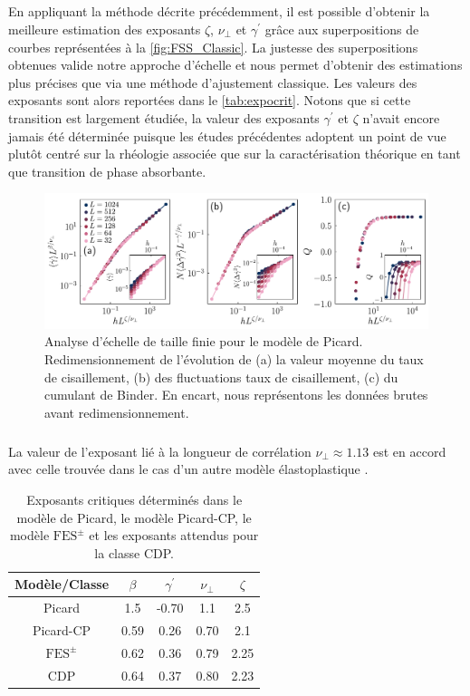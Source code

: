 \subparagraph{}En appliquant la méthode décrite précédemment, il est possible d'obtenir la meilleure estimation des exposants $\zeta$, $\nu_\perp$ et $\gamma^\prime$ grâce aux superpositions de courbes représentées à la \autoref{fig:FSS_Classic}. La justesse des superpositions obtenues valide notre approche d'échelle et  nous permet d'obtenir des estimations plus précises que via une méthode d'ajustement classique. Les valeurs des exposants sont alors reportées dans le \autoref{tab:expocrit}. Notons que si cette transition est largement étudiée, la valeur des exposants $\gamma^\prime$ et $\zeta$ n'avait encore jamais été déterminée puisque les études précédentes adoptent un point de vue plutôt centré sur la rhéologie associée que sur la caractérisation théorique en tant que transition de phase absorbante.

\begin{figure}[h]
	\centering
	\includegraphics[width=\textwidth]{Chapitre4/Figures/CasPhysique/FSS_Classic_edited.pdf}
	\caption{Analyse d'échelle de taille finie pour le modèle de Picard. Redimensionnement de l'évolution de (a) la valeur moyenne du taux de cisaillement, (b) des fluctuations taux de cisaillement, (c) du cumulant de Binder. En encart, nous représentons les données brutes avant redimensionnement.}
	\label{fig:FSS_Classic}
\end{figure}

\subparagraph{}La valeur de l'exposant lié à la longueur de corrélation $\nu_\perp \approx 1.13$ est en accord avec celle trouvée dans le cas d'un autre modèle élastoplastique \cite{lin_scaling_2014}.

\begin{table}
\centering
\begin{tabular}{ccccc}
\hline \hline Modèle/Classe & $\beta$ & \multicolumn{1}{c}{$\gamma^{\prime}$} & $\nu_{\perp}$ & $\zeta$ \\
\hline Picard & 1.5 & -0.70 & 1.1 & 2.5 \\
Picard-CP & 0.59 & 0.26 & 0.70 & 2.1 \\
$\text{FES}^\pm$ & 0.62 & 0.36 & 0.79 & 2.25 \\
CDP \cite{lubeck_universal_2004} & 0.64 & 0.37 & 0.80 & 2.23 \\
\hline \hline
\end{tabular}
\caption{Exposants critiques déterminés dans le modèle de Picard, le modèle Picard-CP, le modèle $\text{FES}^\pm$ et les exposants attendus pour la classe CDP.}
\label{tab:expocrit}
\end{table}

